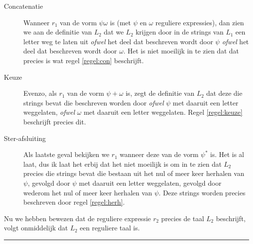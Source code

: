 \documentclass[a4paper,11pt]{article}
\begin{document}
\begin{description}

\item[Concatenatie]

Wanneer $r_{1}$ van de vorm $\psi \omega$ is (met $\psi$ en $\omega$ reguliere
expressies), dan zien we aan de definitie van $L_{2}$ dat we $L_{2}$ krijgen
door in de strings van $L_{1}$ een letter weg te laten uit \emph{ofwel} het
deel dat beschreven wordt door $\psi$ \emph{ofwel} het deel dat beschreven
wordt door $\omega$. Het is niet moeilijk in te zien dat dat precies is wat
regel \ref{regel:con} beschrijft.

\item[Keuze]

Evenzo, als $r_{1}$ van de vorm $\psi + \omega$ is, zegt de definitie van
$L_{2}$ dat deze die strings bevat die beschreven worden door \emph{ofwel}
$\psi$ met daaruit een letter weggelaten, \emph{ofwel} $\omega$ met daaruit
een letter weggelaten. Regel \ref{regel:keuze} beschrijft precies dit.

\item[Ster-afsluiting]

Als laatste geval bekijken we $r_{1}$ wanneer deze van de vorm $\psi^{*}$
is. Het is al laat, dus ik laat het erbij dat het niet moeilijk is om in
te zien dat $L_{2}$ precies die strings bevat die bestaan uit het nul of
meer keer herhalen van $\psi$, gevolgd door $\psi$ met daaruit een letter
weggelaten, gevolgd door wederom het nul of meer keer herhalen van $\psi$.
Deze strings worden precies beschreven door regel \ref{regel:herh}.

\end{description}

Nu we hebben bewezen dat de reguliere expressie $r_{2}$ precies de taal
$L_{2}$ beschrijft, volgt onmiddelijk dat $L_{2}$ een reguliere taal is.

\hfill\rule{2.1mm}{2.mm}
\end{document}
